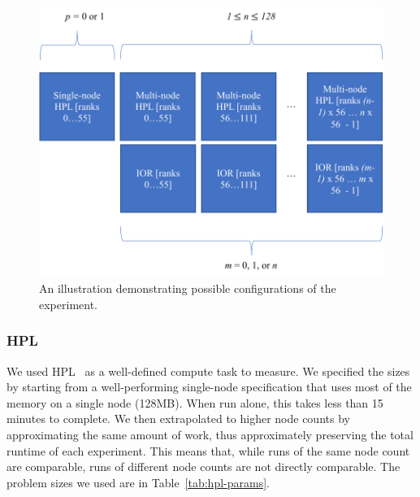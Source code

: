 \begin{figure}[htbp]
\centerline{\includegraphics[width=\columnwidth]{process-layout}}
\caption{An illustration demonstrating possible configurations of the experiment.}
\label{fig:process-layout}
\end{figure}

\subsubsection{HPL}
We used HPL~\cite{hpl} as a well-defined compute task to measure. We specified the sizes by starting from a well-performing single-node specification that uses most of the memory on a single node (128MB). When run alone, this takes less than 15 minutes to complete. We then extrapolated to higher node counts by approximating the same amount of work, thus approximately preserving the total runtime of each experiment. This means that, while runs of the same node count are comparable, runs of different node counts are not directly comparable. The problem sizes we used are in Table~\ref{tab:hpl-params}. %


